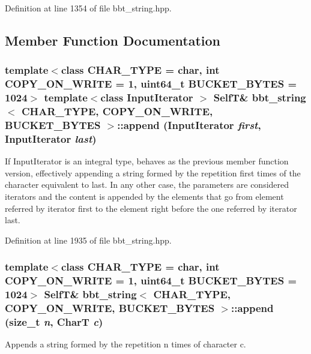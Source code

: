 Definition at line 1354 of file bbt\_\-string.hpp.

\subsection{Member Function Documentation}
\hypertarget{classbbt__string_4ec194b339536af3683b94410c3d492c}{
\subsubsection[{append}]{\setlength{\rightskip}{0pt plus 5cm}template$<$class CHAR\_\-TYPE  = char, int COPY\_\-ON\_\-WRITE = 1, uint64\_\-t BUCKET\_\-BYTES = 1024$>$ template$<$class InputIterator $>$ {\bf SelfT}\& {\bf bbt\_\-string}$<$ CHAR\_\-TYPE, COPY\_\-ON\_\-WRITE, BUCKET\_\-BYTES $>$::append (InputIterator {\em first}, \/  InputIterator {\em last})}}
\label{classbbt__string_4ec194b339536af3683b94410c3d492c}


If InputIterator is an integral type, behaves as the previous member function version, effectively appending a string formed by the repetition first times of the character equivalent to last. In any other case, the parameters are considered iterators and the content is appended by the elements that go from element referred by iterator first to the element right before the one referred by iterator last. 

Definition at line 1935 of file bbt\_\-string.hpp.\hypertarget{classbbt__string_a9fd465e48c33f4f219fc2d0ee41f40e}{
\subsubsection[{append}]{\setlength{\rightskip}{0pt plus 5cm}template$<$class CHAR\_\-TYPE  = char, int COPY\_\-ON\_\-WRITE = 1, uint64\_\-t BUCKET\_\-BYTES = 1024$>$ {\bf SelfT}\& {\bf bbt\_\-string}$<$ CHAR\_\-TYPE, COPY\_\-ON\_\-WRITE, BUCKET\_\-BYTES $>$::append (size\_\-t {\em n}, \/  CharT {\em c})}}
\label{classbbt__string_a9fd465e48c33f4f219fc2d0ee41f40e}


Appends a string formed by the repetition n times of character c. 

